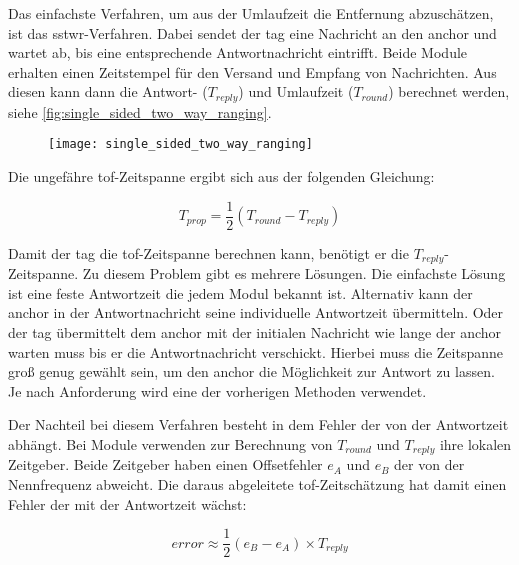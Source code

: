 Das einfachste Verfahren, um aus der Umlaufzeit die Entfernung abzuschätzen, ist das \Gls{sstwr}-Verfahren. Dabei sendet der \Gls{tag} eine Nachricht an den \Gls{anchor} und wartet ab, bis eine entsprechende Antwortnachricht eintrifft. Beide Module erhalten einen Zeitstempel für den Versand und Empfang von Nachrichten. Aus diesen kann dann die Antwort- ($T_{reply}$) und Umlaufzeit ($T_{round}$) berechnet werden, siehe \autoref{fig:single_sided_two_way_ranging}. \cite{decawave2015twr, decawave2016dw1kusermanual}

\begin{figure}
	\centering
	\texttt{[image: single\_sided\_two\_way\_ranging]}
	\label{fig:single_sided_two_way_ranging}
\end{figure}

Die ungefähre \Gls{tof}-Zeitspanne ergibt sich aus der folgenden Gleichung:

\begin{equation}
T_{prop}=\frac{1}{2}\left(T_{round}-T_{reply}\right)
\end{equation}

Damit der \Gls{tag} die \Gls{tof}-Zeitspanne berechnen kann, benötigt er die $T_{reply}$-Zeitspanne. Zu diesem Problem gibt es mehrere Lösungen. Die einfachste Lösung ist eine feste Antwortzeit die jedem Modul bekannt ist. Alternativ kann der \Gls{anchor} in der Antwortnachricht seine individuelle Antwortzeit übermitteln. Oder der \Gls{tag} übermittelt dem \Gls{anchor} mit der initialen Nachricht wie lange der \Gls{anchor} warten muss bis er die Antwortnachricht verschickt. Hierbei muss die Zeitspanne groß genug gewählt sein, um den \Gls{anchor} die Möglichkeit zur Antwort zu lassen. Je nach Anforderung wird eine der vorherigen Methoden verwendet.

Der Nachteil bei diesem Verfahren besteht in dem Fehler der von der Antwortzeit abhängt. Bei Module verwenden zur Berechnung von $T_{round}$ und $T_{reply}$ ihre lokalen Zeitgeber. Beide Zeitgeber haben einen Offsetfehler $e_{A}$ und $e_{B}$ der von der Nennfrequenz abweicht. Die daraus abgeleitete \Gls{tof}-Zeitschätzung hat damit einen Fehler der mit der Antwortzeit wächst:

\begin{equation}
error\approx\frac{1}{2}\left(e_B-e_A\right)\times T_{reply}
\end{equation}


